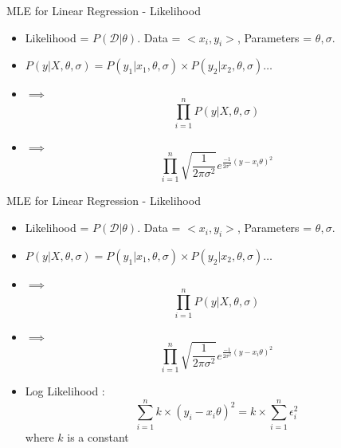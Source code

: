 \documentclass{beamer}
\begin{document}
\begin{frame}{MLE for Linear Regression - Likelihood}
\begin{itemize}
\item Likelihood = $P(\mathcal{D}|\theta)$. Data = $<x_i, y_i>$, Parameters = $\theta, \sigma$.
\item $P(y | X, \theta, \sigma) = P(y_1 | x_1, \theta, \sigma) \times P(y_2 | x_2, \theta, \sigma) \dots$
\item $\implies$ \begin{equation*}
  \prod_{i=1}^{n} P(y | X, \theta, \sigma)
\end{equation*}
\item $\implies$ \begin{equation*}
    \prod_{i=1}^{n} \sqrt{\frac{1}{2 \pi \sigma^{2}}}e^{\frac{-1}{2\sigma^{2}}(y - x_i\theta)^{2}}
\end{equation*}
\end{itemize}

\end{frame}


\begin{frame}{MLE for Linear Regression - Likelihood}
\begin{itemize}
\item Likelihood = $P(\mathcal{D}|\theta)$. Data = $<x_i, y_i>$, Parameters = $\theta, \sigma$.
\item $P(y | X, \theta, \sigma) = P(y_1 | x_1, \theta, \sigma) \times P(y_2 | x_2, \theta, \sigma) \dots$
\item $\implies$ \begin{equation*}
  \prod_{i=1}^{n} P(y | X, \theta, \sigma)
\end{equation*}
\item $\implies$ \begin{equation*}
    \prod_{i=1}^{n} \sqrt{\frac{1}{2 \pi \sigma^{2}}}e^{\frac{-1}{2\sigma^{2}}(y - x_i\theta)^{2}}
\end{equation*}
\item Log Likelihood : \begin{equation*}
    \sum_{i = 1}^{n} k \times (y_i - x_i\theta)^{2} = k \times \sum_{i=1}^{n}\epsilon_i^{2}
\end{equation*}
where $k$ is a constant
\end{itemize}

\end{frame}
\end{document}
